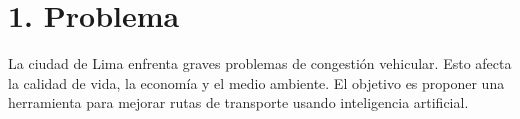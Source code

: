 \section*{1. Problema}
La ciudad de Lima enfrenta graves problemas de congestión vehicular. Esto afecta la calidad de vida, la economía y el medio ambiente. El objetivo es proponer una herramienta para mejorar rutas de transporte usando inteligencia artificial.

